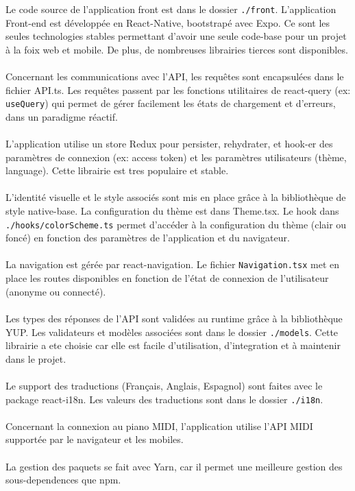 Le code source de l’application front est dans le  dossier \verb|./front|.
L’application Front-end est développée en React-Native, bootstrapé avec Expo. Ce sont les seules technologies stables permettant d'avoir une seule code-base pour un projet à la foix web et mobile. De plus, de nombreuses librairies tierces sont disponibles. 
\\\\
Concernant les communications avec l’API, les requêtes sont encapsulées dans le fichier API.ts. Les requêtes passent par les fonctions utilitaires de react-query (ex: \verb|useQuery|) qui permet de gérer facilement les états de chargement et d’erreurs, dans un paradigme réactif.
\\\\
L’application utilise un store Redux pour persister, rehydrater, et hook-er des paramètres de connexion (ex: access token) et les paramètres utilisateurs (thème, language). Cette librairie est tres populaire et stable. 
\\\\
L’identité visuelle et le style associés sont mis en place grâce à la bibliothèque de style native-base. La configuration du thème est dans Theme.tsx. Le hook dans \verb|./hooks/colorScheme.ts| permet d’accéder à la configuration du thème (clair ou foncé) en fonction des paramètres de l’application et du navigateur.
\\\\
La navigation est gérée par react-navigation. Le fichier \verb|Navigation.tsx| met en place les routes disponibles en fonction de l’état de connexion de l’utilisateur (anonyme ou connecté).
\\\\
Les types des réponses de l’API sont validées au runtime grâce à la bibliothèque YUP. Les validateurs et modèles associées sont dans le dossier \verb|./models|. Cette librairie a ete choisie car elle est facile d'utilisation, d'integration et à maintenir dans le projet.
\\\\
Le support des traductions (Français, Anglais, Espagnol) sont faites avec le package react-i18n. Les valeurs des traductions sont dans le dossier \verb|./i18n|.
\\\\
Concernant la connexion au piano MIDI, l’application utilise l’API MIDI supportée par le navigateur et les mobiles.
\\\\
La gestion des paquets se fait avec Yarn, car il permet une meilleure gestion des sous-dependences que npm.
